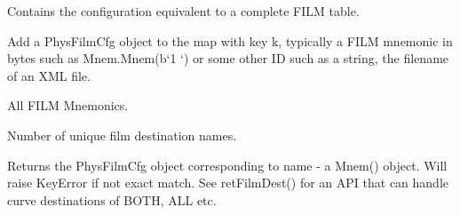 \documentclass[letterpaper,10pt,english]{sphinxmanual}
\begin{document}
\begin{fulllineitems}
\label{\detokenize{ref/util/plot/FILMCfg:TotalDepth.util.plot.FILMCfg.FilmCfg}}
Contains the configuration equivalent to a complete FILM table.

\begin{fulllineitems}
\label{\detokenize{ref/util/plot/FILMCfg:TotalDepth.util.plot.FILMCfg.FilmCfg.add}}
Add a PhysFilmCfg object to the map with key k, typically a FILM
mnemonic in bytes such as Mnem.Mnem(b‘1   ‘) or
some other ID such as a string, the filename of an XML file.

\end{fulllineitems}


\begin{fulllineitems}
\label{\detokenize{ref/util/plot/FILMCfg:TotalDepth.util.plot.FILMCfg.FilmCfg.keys}}
All FILM Mnemonics.

\end{fulllineitems}


\begin{fulllineitems}
\label{\detokenize{ref/util/plot/FILMCfg:TotalDepth.util.plot.FILMCfg.FilmCfg.__len__}}
Number of unique film destination names.

\end{fulllineitems}


\begin{fulllineitems}
\label{\detokenize{ref/util/plot/FILMCfg:TotalDepth.util.plot.FILMCfg.FilmCfg.__getitem__}}
Returns the PhysFilmCfg object corresponding to name - a Mnem() object.
Will raise KeyError if not exact match. See retFilmDest() for an API that can
handle curve destinations of BOTH, ALL etc.

\end{fulllineitems}


\end{fulllineitems}
\end{document}
